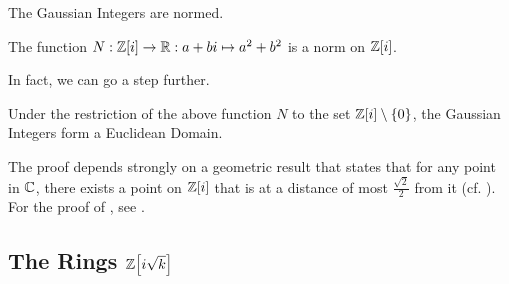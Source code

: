 The Gaussian Integers are normed.

\begin{boxproposition}
    The function $N : \mathbb{Z}\!\left[ i \right] \to \mathbb{R} : a + bi \mapsto a^2 + b^2$ is a norm on $\mathbb{Z}\!\left[ i \right]$.
\end{boxproposition}

In fact, we can go a step further.

\begin{boxtheorem}\label{Ch1:Thm:GaussianIntegersEuclidean}
    Under the restriction of the above function $N$ to the set $\mathbb{Z}\!\left[ i \right] \setminus \left\{ 0 \right\}$, the Gaussian Integers form a Euclidean Domain.
\end{boxtheorem}

The proof depends strongly on a geometric result that states that for any point in $\mathbb{C}$, there exists a point on $\mathbb{Z}\!\left[ i \right]$ that is at a distance of most $\frac{\sqrt{2}}{2}$ from it (cf. \cite[Proposition 2.4]{AmbrusPal}). For the proof of , see \cite[Theorem 2.3]{AmbrusPal}.

\subsection{The Rings $\mathbb{Z}\!\left[ i\sqrt{k} \right]$}


